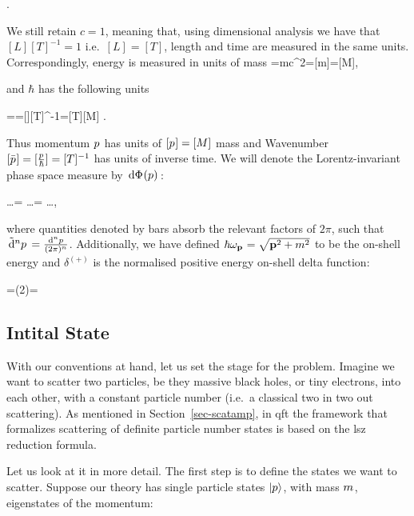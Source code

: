 \documentclass[
  11pt,
  a4paper,
  DIV=11,
  numbers=noendperiod,
  twoside]{scrreprt}
\let\[\relax \let\]\relax %
\DeclareRobustCommand{\[}{\begin{equation}}
\DeclareRobustCommand{\]}{\end{equation}}
\begin{document}
\[\hbar{}.\]

We still retain \(c=1\), meaning that, using dimensional analysis we
have that \([L][T]^{-1}=1\) i.e.~\([L]=[T]\), length and time are
measured in the same units. Correspondingly, energy is measured in units
of mass \[
\energy=mc^2\implies[\energy]=[m]=[M],
\]

and \(\hbar\) has the following units

\[
\energy=\hbar \omega\implies [M]=[\hbar][T]^{-1}\implies [\hbar]=[T][M]
.\]

Thus momentum \(\emom\) has units of \([\emom]=[M]\) mass and Wavenumber
\([\bar{\emom}]=[\frac{\emom}{\hbar}]=[T]^{-1}\) has units of inverse
time. We will denote the Lorentz-invariant phase space measure by
\(\ddP{p}\):

\[
\int {} \dots      = \int {} \dots = \int {} \dots,
\]

where quantities denoted by bars absorb the relevant factors of
\(2\pi\), such that \(\dn[n]{p}=\frac{\dd[n]p}{(2\pi)^n}\).
Additionally, we have defined \(\hbar\shellen=\sqrt{\tv{p}^2+m^2}\) to
be the on-shell energy and \(\delta^{(+)}\) is the normalised positive
energy on-shell delta function:

\[
=(2\pi)=
\]

\hypertarget{intital-state}{%
\subsection{Intital State}\label{intital-state}}

With our conventions at hand, let us set the stage for the problem.
Imagine we want to scatter two particles, be they massive black holes,
or tiny electrons, into each other, with a constant particle number
(i.e.~a classical two in two out scattering). As mentioned in
Section~\ref{sec-scatamp}, in \gls{qft} the framework that formalizes
scattering of definite particle number states is based on the \gls{lsz}
reduction formula.

{}

Let us look at it in more detail. The first step is to define the states
we want to scatter. Suppose our theory has single particle states
\(\momket\), with mass \(\mass\), eigenstates of the momentum:
\end{document}
